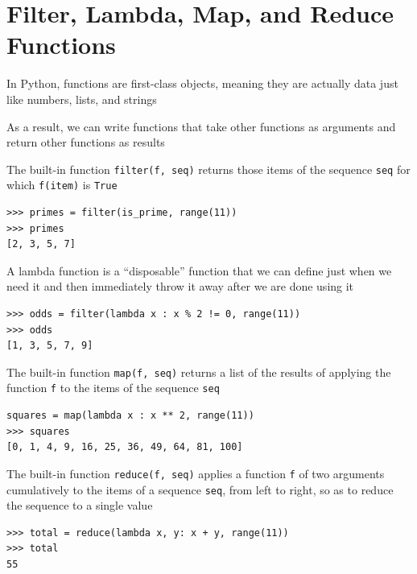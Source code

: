 \documentclass[8pt,a4paper,compress]{beamer}
\begin{document}
\section{Filter, Lambda, Map, and Reduce Functions}
\begin{frame}[fragile]
\pause

In Python, functions are first-class objects, meaning they are actually data just like numbers, lists, and strings

\pause
\bigskip

As a result, we can write functions that take other functions as arguments and return other functions as results

\pause
\bigskip

The built-in function \lstinline{filter(f, seq)} returns those items of the sequence \lstinline{seq} for which \lstinline{f(item)} is \lstinline{True}
\begin{lstlisting}[language={}]
>>> primes = filter(is_prime, range(11))
>>> primes
[2, 3, 5, 7]
\end{lstlisting}

\pause
\bigskip

A lambda function is a ``disposable'' function that we can define just when we need it and then immediately throw it away after we are done using it
\begin{lstlisting}[language={}]
>>> odds = filter(lambda x : x % 2 != 0, range(11))
>>> odds
[1, 3, 5, 7, 9]
\end{lstlisting}
\end{frame}

\begin{frame}[fragile]
\pause

The built-in function \lstinline{map(f, seq)} returns a list of the results of applying the function \lstinline{f} to the items of the sequence \lstinline{seq}
\begin{lstlisting}[language={}]
squares = map(lambda x : x ** 2, range(11))
>>> squares
[0, 1, 4, 9, 16, 25, 36, 49, 64, 81, 100]
\end{lstlisting}

\pause
\bigskip

The built-in function \lstinline{reduce(f, seq)} applies a function \lstinline{f} of two arguments cumulatively to the items of a sequence \lstinline{seq}, from left to right, so as to reduce the sequence to a single value
\begin{lstlisting}[language={}]
>>> total = reduce(lambda x, y: x + y, range(11))
>>> total
55
\end{lstlisting}
\end{frame}
\end{document}
